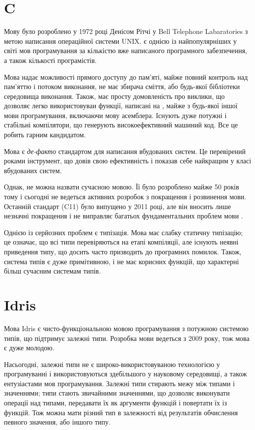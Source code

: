 \documentclass[oneside,14pt,a4paper,final]{myextreport}
\begin{document}
\section{C}

Мову \LangC{} було розроблено у 1972 році Денісом Рітчі у Bell Telephone Labaratories з метою написання операційної системи UNIX\cite{stewart-bill:history-of-c}. \LangC{} є однією із найпопулярніших у світі мов програмування за кількістю вже написаного програмного забезпечення, а також кількості програмістів.

Мова \LangC{} надає можливості прямого доступу до пам'яті, майже повний контроль над пам'яттю і потоком виконання, не має збирача сміття, або будь-якої бібліотеки середовища виконання. Також, \LangC{} має просту домовленість про виклики, що дозволяє легко використовуваи функції, написані на \LangC{}, майже з будь-якої іншої мови програмування, включаючи мову асемблера. Існують дуже потужні і стабільні компілятори, що генерують високоефективний машиний код. Все це робить \LangC{} гарним кандидатом.

Мова \LangC{} є \emph{де-факто} стандартом для написання вбудованих систем. Це перевірений роками інструмент, що довів свою ефективність і показав себе найкращим у класі вбудованих систем.

Однак, \LangC{} не можна назвати сучасною мовою. Її було розроблено майже 50 років тому і сьогодні не ведеться активних розробок з покращення і розвинення мови. Останній стандарт (C11) було випущено у 2011 році, але він вносить лише незначні покращення і не виправляє багатьох фундаментальних проблем мови \LangC{}.

Однією із серйозних проблем \LangC{} є типізація. Мова \LangC{} має слабку статичну типізацію; це означає, що всі типи перевіряються на етапі компіляції, але існують неявні приведення типу, що досить часто призводить до програмних помилок. Також, система типів є дуже примітивною, і не має корисних функцій, що характерні більш сучасним системам типів.

\section{Idris}

Мова Idris\cite{idris} є чисто-функціональною мовою програмування з потужною системою типів, що підтримує залежні типи. Розробка мови ведеться з 2009 року\cite{idris:first-release}, тож мова є дуже молодою.

Насьогодні, залежні типи не є широко-використовуваною технологією у програмуванні і використовуються здебільшого у науковому середовищі, а також ентузіастами мов програмування. Залежні типи стирають межу між типами і значеннями; типи стають звичайними значеннями, що дозволяє виконувати операції над типами, передавати їх як аргументи функцій і повертати їх із функцій. Тож можна мати різний тип в залежності від результатів обчислення певного значення, або іншого типу.
\end{document}
